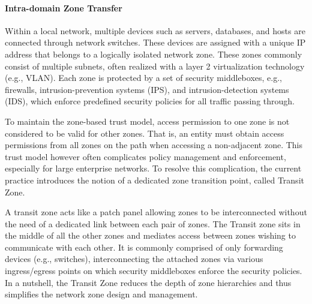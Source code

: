 \paragraph{Intra-domain Zone Transfer}
Within a local network, multiple devices such as servers, databases, and hosts are connected
through network switches. These devices are assigned with a unique IP address that belongs
to a logically isolated network zone. These zones commonly consist of multiple subnets, 
often realized with a layer 2 virtualization technology (e.g., VLAN). Each zone is protected 
by a set of security middleboxes, e.g., firewalls, intrusion-prevention systems (IPS),
and intrusion-detection systems (IDS),
which enforce predefined security policies for all traffic passing through.

To maintain the zone-based trust model, access permission to one zone is not considered to be 
valid for other zones. That is, an entity must obtain access permissions from all zones on the path when accessing a non-adjacent zone. This trust model
however often complicates policy management and enforcement, especially for large 
enterprise networks. 
To resolve this complication, the current practice introduces the notion of a dedicated zone transition
point, called Transit Zone.

A transit zone acts like a patch panel allowing zones to be interconnected without the need 
of a dedicated link between each pair of zones. The Transit zone sits in the middle of all 
the other zones and mediates access between zones wishing to communicate with each other.
It is commonly comprised of only forwarding devices (e.g., switches), interconnecting the 
attached zones via various ingress/egress points on which security middleboxes enforce the 
security policies. In a nutshell, the Transit Zone reduces the depth of zone hierarchies and 
thus simplifies the network zone design and management.

